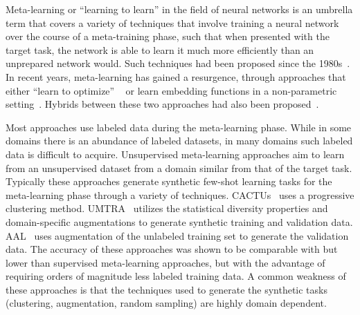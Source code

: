 \documentclass{article}
\begin{document}
Meta-learning or ``learning to learn'' in the field of neural networks is an umbrella term that covers a variety of techniques that involve training a neural network over the course of a meta-training phase, such that when presented with the target task, the network is able to learn it much more efficiently than an unprepared network would. Such techniques had been proposed since the 1980s~\cite{schmidhuber1987evolutionary, bengio1990learning, naik1992meta, Sebastian1998}. In recent years, meta-learning has gained a resurgence, through approaches that either ``learn to optimize'' ~\cite{finn2017model,sachin2016,Mishra2017, reptile2018, rusu2018,rajeswaran2019meta} or learn embedding functions in a non-parametric setting~\cite{snell2017prototypical, matchingnet2016, Ren2018, Liu}.  Hybrids between these two approaches had also been proposed~\cite{triantafillou2019meta,wang2019hybrid}.
















Most approaches use labeled data during the meta-learning phase. While in some domains there is an abundance of labeled datasets, in many domains such labeled data is difficult to acquire. Unsupervised meta-learning approaches aim to learn from an unsupervised dataset from a domain similar from that of the target task. Typically these approaches generate synthetic few-shot learning tasks for the meta-learning phase through a variety of techniques. CACTUs~\cite{hsu2018unsupervised} uses a progressive clustering method. UMTRA~\cite{khodadadeh2019unsupervised} utilizes the statistical diversity properties and domain-specific augmentations to generate synthetic training and validation data. AAL~\cite{AAL2019} uses augmentation of the unlabeled training set to generate the validation data. The accuracy of these approaches was shown to be comparable with but lower than supervised meta-learning approaches, but with the advantage of requiring orders of magnitude less labeled training data. A common weakness of these approaches is that the techniques used to generate the synthetic tasks (clustering, augmentation, random sampling) are highly domain dependent.  
\end{document}
